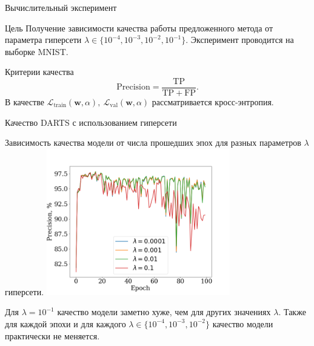\documentclass{beamer}
\begin{document}
\begin{frame}{Вычислительный эксперимент}

\begin{block}{Цель}
Получение зависимости качества работы предложенного метода от параметра гиперсети $\lambda \in \{10^{-4}, 10^{-3}, 10^{-2}, 10^{-1}\}$.
 Эксперимент проводится на выборке MNIST.
\end{block}

\begin{block}{Критерии качества}
 $$\mathrm{Precision} = \frac{\mathrm{TP}}{\mathrm{TP} + \mathrm{FP}}.$$
 В качестве $\mathcal{L}_\text{train}(\mathbf{w}, \alpha), ~\mathcal{L}_\text{val}(\mathbf{w}, \alpha)$ рассматривается кросс-энтропия.
\end{block}

\end{frame}

\begin{frame}{Качество DARTS с использованием гиперсети}

\begin{center}
Зависимость качества модели от числа прошедших эпох для разных параметров $\lambda$ гиперсети.
\includegraphics[width=0.6\textwidth]{main_100_exp}
\end{center}

Для $\lambda = 10^{-1}$ качество модели заметно хуже, чем для других значениях $\lambda$. Также для каждой эпохи и для каждого $\lambda \in \{10^{-4}, 10^{-3}, 10^{-2}\}$ качество модели практически не меняется.

\end{frame}
\end{document}
